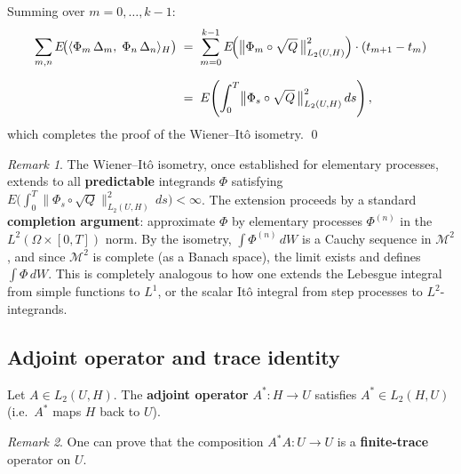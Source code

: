 \documentclass[11pt]{article}
\theoremstyle{definition}
\theoremstyle{remark}
\newtheorem{remark}{Remark}
\begin{document}
\noindent
Summing over $m = 0, \ldots, k-1$:
\begin{align*}
    \sum_{m,n} E\!\bigl(\langle \Phi_m\,\Delta_m,\;
    \Phi_n\,\Delta_n\rangle_H\bigr)
    &\;=\;
    \sum_{m=0}^{k-1}
    E\!\Bigl(
        \bigl\|\Phi_m \circ \sqrt{Q}\,\bigr\|_{L_2(U,H)}^2
    \Bigr)
    \cdot (t_{m+1} - t_m) \\[6pt]
    &\;=\;
    E\!\left(
        \int_0^T
        \bigl\|\Phi_s \circ \sqrt{Q}\,\bigr\|_{L_2(U,H)}^2
        \,ds
    \right),
\end{align*}
which completes the proof of the Wiener--Itô isometry. \qed

\begin{remark}
The Wiener--It\^o isometry, once established for elementary processes, extends to all \textbf{predictable} integrands $\Phi$ satisfying $E\!\bigl(\int_0^T \|\Phi_s \circ \sqrt{Q}\|_{L_2(U,H)}^2\,ds\bigr) < \infty$.
The extension proceeds by a standard \textbf{completion argument}: approximate $\Phi$ by elementary processes $\Phi^{(n)}$ in the $L^2(\Omega \times [0,T])$ norm.  By the isometry, $\int \Phi^{(n)}\,dW$ is a Cauchy sequence in $\mathcal{M}^2$, and since $\mathcal{M}^2$ is complete (as a Banach space), the limit exists and defines $\int \Phi\,dW$.
This is completely analogous to how one extends the Lebesgue integral from simple functions to $L^1$, or the scalar It\^o integral from step processes to $L^2$-integrands.
\end{remark}

\subsection*{Adjoint operator and trace identity}


Let $A \in L_2(U, H)$.  The \textbf{adjoint operator}
$A^* \colon H \to U$ satisfies $A^* \in L_2(H, U)$
(i.e.\ $A^*$ maps $H$ back to $U$).

\begin{remark}
One can prove that the composition $A^*\!A \colon U \to U$ is a
\textbf{finite-trace} operator on $U$.
\end{remark}
\end{document}
